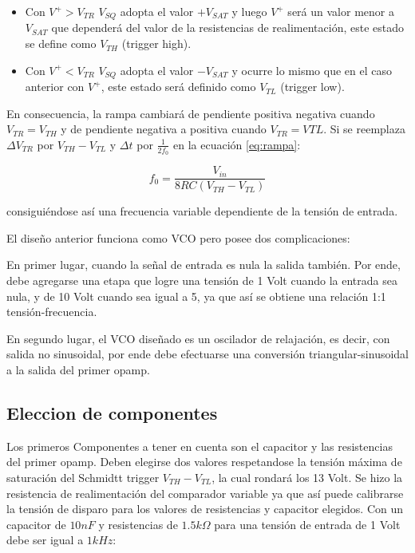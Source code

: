 \begin{itemize}
	\item Con $V^{+} > V_{TR}$ $V_{SQ}$ adopta el valor $+V_{SAT}$ y luego $V^{+}$ será un valor menor a $V_{SAT}$ que dependerá del valor de la resistencias de realimentación, este estado se define como $V_{TH}$ (trigger high).
	\item Con  $V^{+} < V_{TR}$ $V_{SQ}$ adopta el valor $-V_{SAT}$ y ocurre lo mismo que en el caso anterior con $V^{+}$, este estado será definido como $V_{TL}$ (trigger low).
\end{itemize}


En consecuencia, la rampa cambiará de pendiente positiva  negativa cuando $V_{TR} = V_{TH}$ y de pendiente negativa a positiva cuando $V_{TR} = V{TL}$. Si se reemplaza $\Delta V_{TR}$ por $V_{TH} - V_{TL}$ y $\Delta t $ por $\frac{1}{2f_0}$ en la ecuación \ref{eq:rampa}:

\begin{equation}\label{eq:frecuencia}
f_0 = \frac{V_{in}}{8RC(V_{TH} - V_{TL})}
\end{equation}

consiguiéndose así una frecuencia variable dependiente de la tensión de entrada. \newline

El diseño anterior funciona como VCO pero posee dos complicaciones: \newline

En primer lugar, cuando la señal de entrada es nula la salida también. Por ende, debe agregarse una etapa que logre una tensión de 1 Volt cuando la entrada sea nula, y de 10 Volt cuando sea igual a 5, ya que así se obtiene una relación 1:1 tensión-frecuencia. \newline

En segundo lugar, el VCO diseñado es un oscilador de relajación, es decir, con salida no sinusoidal, por ende debe efectuarse una conversión triangular-sinusoidal a la salida del primer opamp. 

\subsection{Eleccion de componentes}

Los primeros Componentes a tener en cuenta son el capacitor y las resistencias del primer opamp. Deben elegirse dos valores respetandose la tensión máxima de saturación del Schmidtt trigger $V_{TH} - V_{TL}$, la cual rondará los 13 Volt. Se hizo la resistencia de realimentación del comparador variable ya que así puede calibrarse la tensión de disparo para los valores de resistencias y capacitor elegidos. Con un capacitor de $10nF$ y resistencias de $1.5k\Omega$ para una tensión de entrada de 1 Volt debe ser igual a $1kHz$:

